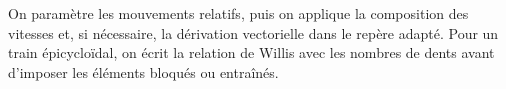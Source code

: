 \begin{corrigebox}[Corrigé]
On paramètre les mouvements relatifs, puis on applique la composition des vitesses et, si nécessaire, la dérivation vectorielle dans le repère adapté. Pour un train épicycloïdal, on écrit la relation de Willis avec les nombres de dents avant d'imposer les éléments bloqués ou entraînés.
\end{corrigebox}
